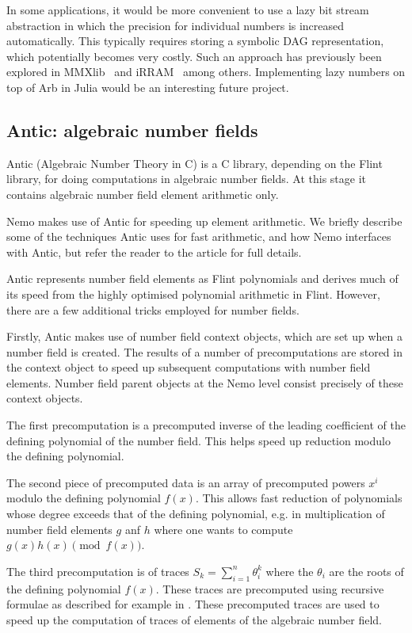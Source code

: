 \documentclass{sig-alternate-05-2015}
\begin{document}
In some applications, it would be more convenient to use a lazy
bit stream abstraction in which the precision for individual
numbers is increased automatically.
This typically requires storing a symbolic DAG representation,
which potentially becomes very costly.
Such an approach has previously been explored in MMXlib~\cite{mmxlibeffective} and iRRAM~\cite{irram}
among others.
Implementing lazy numbers on top of Arb in Julia
would be an interesting future project.

\subsection{Antic: algebraic number fields}

Antic (Algebraic Number Theory in C) is a C library, depending on the Flint library, for
doing computations in algebraic number fields. At this stage it contains algebraic number
field element arithmetic only.

Nemo makes use of Antic for speeding up element arithmetic. We briefly describe some
of the techniques Antic uses for fast arithmetic, and how Nemo interfaces with Antic, but
refer the reader to the article \cite{antic} for full details.

Antic represents number field elements as Flint polynomials and derives much of its speed
from the highly optimised polynomial arithmetic in Flint. However, there are a few
additional tricks employed for number fields.

Firstly, Antic makes use of number field context objects, which are set up when a number
field is created. The results of a number of precomputations are stored in the context
object to speed up subsequent computations with number field elements. Number field parent
objects at the Nemo level consist precisely of these context objects.

The first precomputation is a precomputed inverse of the leading coefficient of the defining
polynomial of the number field. This helps speed up reduction modulo the defining polynomial.

The second piece of precomputed data is an array of precomputed powers $x^i$ modulo the
defining polynomial $f(x)$. This allows fast reduction of polynomials whose degree exceeds
that of the defining polynomial, e.g. in multiplication of number field elements $g$ anf $h$
where one wants to compute $g(x)h(x) \pmod{f(x)}$.

The third precomputation is of traces $S_k = \sum_{i=1}^n \theta_i^k$ where the $\theta_i$
are the roots of the defining polynomial $f(x)$. These traces are precomputed using
recursive formulae as described for example in \cite{Cohen1993}. These precomputed traces are
used to speed up the computation of traces of elements of the algebraic number field.
\end{document}
